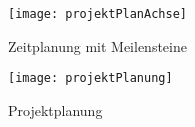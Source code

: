 \begin{figure}[htb!]
	\begin{center}
		\texttt{[image: projektPlanAchse]}
		\caption[Projektplanung Meilensteine]{Zeitplanung mit Meilensteine}
		\label{fig:projektPlanungAchse}
	\end{center}
\end{figure}


\begin{figure}[htb!]
	\begin{center}
		\texttt{[image: projektPlanung]}
		\caption[Projektplanung]{Projektplanung}
		\label{fig:projektPlanung}
	\end{center}
\end{figure}


\newpage
